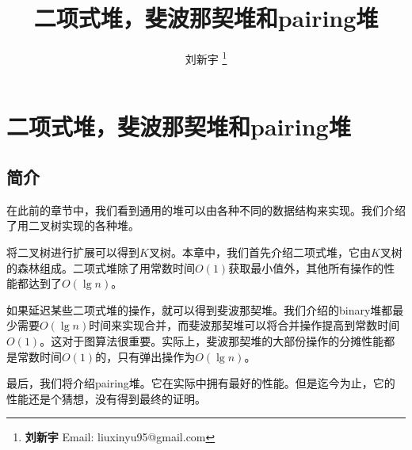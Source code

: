 \documentclass[UTF8]{article}
\begin{document}


\title{二项式堆，斐波那契堆和pairing堆}

\author{刘新宇
\thanks{{\bfseries 刘新宇 } \newline
  Email: liuxinyu95@gmail.com \newline}
  }

\maketitle
\fi


\ifx\wholebook\relax
\chapter{二项式堆，斐波那契堆和pairing堆}
\fi

\section{简介}
\label{introduction}

在此前的章节中，我们看到通用的堆可以由各种不同的数据结构来实现。我们介绍了用二叉树实现的各种堆。

将二叉树进行扩展可以得到$K$叉树\cite{K-ary-tree}。本章中，我们首先介绍二项式堆，它由$K$叉树的森林组成。二项式堆除了用常数时间$O(1)$获取最小值外，其他所有操作的性能都达到了$O(\lg n)$。

如果延迟某些二项式堆的操作，就可以得到斐波那契堆。我们介绍的binary堆都最少需要$O(\lg n)$时间来实现合并，而斐波那契堆可以将合并操作提高到常数时间$O(1)$。这对于图算法很重要。实际上，斐波那契堆的大部份操作的分摊性能都是常数时间$O(1)$的，只有弹出操作为$O(\lg n)$。

最后，我们将介绍pairing堆。它在实际中拥有最好的性能。但是迄今为止，它的性能还是个猜想，没有得到最终的证明。


\end{document}
